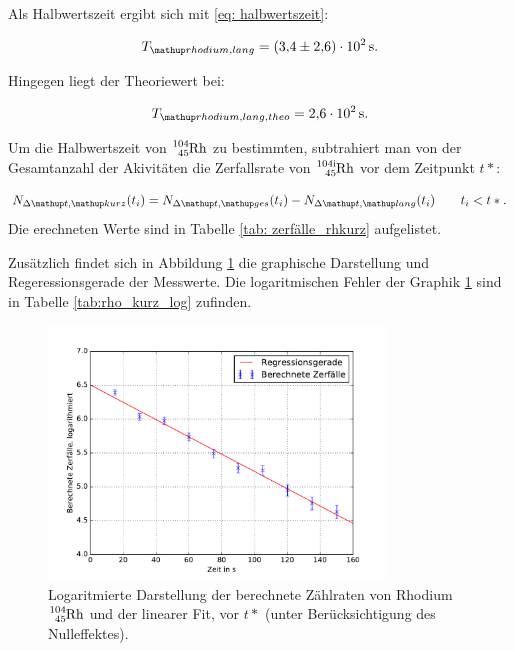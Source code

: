 Als Halbwertszeit ergibt sich mit \eqref{eq: halbwertszeit}:

\begin{equation}
  \label{eq:halbwertzeit_rhodium}
  T\ua{rhodium, lang}=\SI{3.4\pm2.6 e+2}{\second}.
\end{equation}

Hingegen liegt der Theoriewert\cite{rhodium_lang_halb} bei:

\begin{equation}
  \label{eq:halbwertzeit_rhodium_theo}
  T\ua{rhodium, lang, theo}=\SI{2.6 e+2}{\second}.
\end{equation}


Um die Halbwertszeit von $\ce{^{104}_{45} Rh}$ zu bestimmten, subtrahiert man von der
Gesamtanzahl der Akivitäten die Zerfallsrate von $\ce{^{104i}_{45} Rh}$ vor dem
Zeitpunkt $t*$:

\begin{equation*}
  N_{\Delta \map{t}, \map{kurz}}(t_i)=N_{\Delta \map{t}, \map{ges}}(t_i)-N_{\Delta \map{t}, \map{lang}}(t_i) \qquad t_i<t*.
\end{equation*}
Die erechneten Werte sind in Tabelle \ref{tab: zerfälle_rhkurz} aufgelistet.


Zusätzlich findet sich in Abbildung \ref{fig: plot_rhodium_kurz} die graphische Darstellung
und Regeressionsgerade der Messwerte. Die logaritmischen Fehler der Graphik \ref{fig: plot_rhodium_kurz}
sind in Tabelle \ref{tab:rho_kurz_log} zufinden.


\begin{figure}
  \centering
  \includegraphics[width=0.8\textwidth]{pics/rhodium_kurz_berechnet.pdf}
  \caption{Logaritmierte Darstellung der berechnete Zählraten von Rhodium $\ce{^{104}_{45} Rh}$ und der linearer Fit, vor $t*$ (unter Berücksichtigung des Nulleffektes).}
  \label{fig: plot_rhodium_kurz}
\end{figure}


